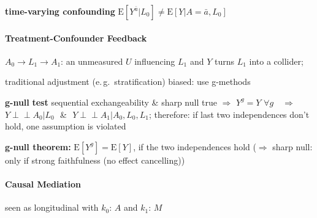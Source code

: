 \documentclass[8pt,twoside]{extarticle}
\newcommand{\indep}{\perp \!\!\! \perp}
\begin{document}
\begin{multicols}{2}
{\begin{minipage}{28em}
 \textbf{time-varying confounding} $\mathrm{E}\left[Y^{\bar{a}}|L_0\right] \neq \mathrm{E}\left[Y|A=\bar{a}, L_0\right]$


\end{minipage}}

\vspace{1.5em}

 \colorbox{lightgray!20!white}{\begin{minipage}{28em}


\paragraph{Treatment-Confounder Feedback} $A_0 \rightarrow L_1 \rightarrow A_1$: an unmeasured $U$ influencing $L_1$ and $Y$ turns $L_1$ into a collider;

 traditional adjustment (e.\,g.\ stratification) biased: use g-methods

 \textbf{g-null\,\,test} sequential exchangeability \& sharp null true $\Rightarrow$ $Y^g {=} Y \,\, \forall g$ $\,\,\,\,\Rightarrow \,\,\,\,$ $Y {\indep} A_0|L_0\,\,$ \& \,\,$Y {\indep} A_1|A_0, L_0, L_1$;
therefore: \newline if last two independences don't hold, one assumption is violated

 \textbf{g-null theorem:} $\mathrm{E}\left[Y^g\right] = \mathrm{E}\left[Y\right]$, if the two independences hold \newline($\Rightarrow$ sharp null: only if strong faithfulness (no effect cancelling))

\end{minipage}}

\vspace{1.5em}

 \colorbox{lightgray!20!white}{\begin{minipage}{28em}

\paragraph{Causal Mediation} \citep{hernan2023causal}

  seen as longitudinal with  $k_0$: $A$ and $k_1$: $M$



\end{minipage}}
\end{multicols}
\end{document}
